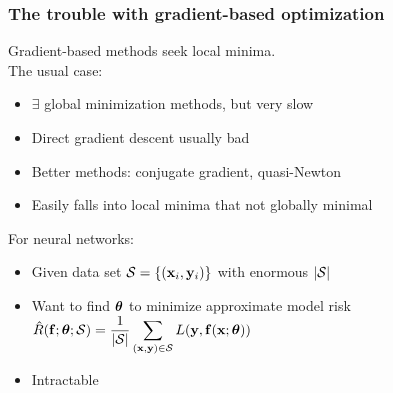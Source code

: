 \begin{frame}
    \frametitle{The trouble with gradient-based optimization}

    Gradient-based methods \citep{PressNR} seek local minima. \\[1ex]

    The usual case:
    \begin{itemize}
        \item $\exists$ global minimization methods, but very slow
        \item Direct gradient descent usually bad
        \item Better methods: conjugate gradient, quasi-Newton
        \item \alert{Easily falls into local minima that not globally minimal}
    \end{itemize}
    \pause

    For neural networks:
    \begin{itemize}
        \item Given data set $\S = \{(\x_i, \y_i)\}$ with enormous $|\S|$
        \item Want to find $\THETA$ to minimize approximate model risk $\displaystyle \hat{R}(\f; \THETA; \S) = \frac{1}{|\S|} \sum_{(\x, \y) \in \S} L(\y, \f(\x; \THETA))$
        \item \alert{Intractable}
    \end{itemize}
\end{frame}

